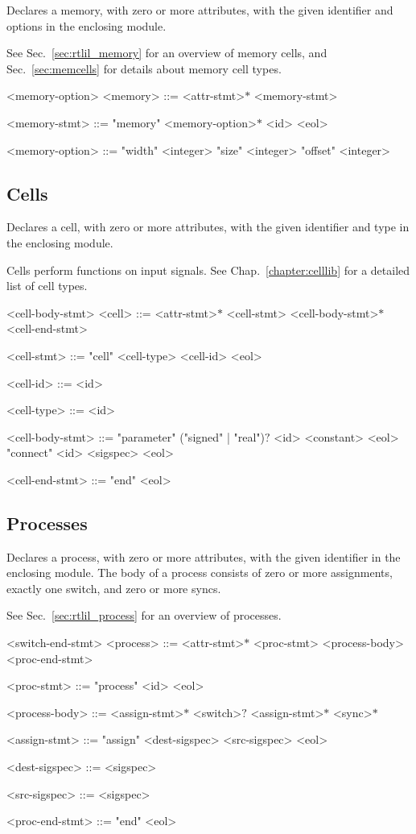 Declares a memory, with zero or more attributes, with the given identifier and options in the enclosing module.

See Sec.~\ref{sec:rtlil_memory} for an overview of memory cells, and Sec.~\ref{sec:memcells} for details about memory cell types.

\begin{indentgrammar}{<memory-option>}
<memory> ::= <attr-stmt>$*$ <memory-stmt>

<memory-stmt> ::= "memory" <memory-option>$*$ <id> <eol>

<memory-option> ::= 
"width" <integer>
  \alt "size" <integer>
  \alt "offset" <integer>
\end{indentgrammar}

\subsection{Cells}

Declares a cell, with zero or more attributes, with the given identifier and type in the enclosing module. 

Cells perform functions on input signals. See Chap.~\ref{chapter:celllib} for a detailed list of cell types.

\begin{indentgrammar}{<cell-body-stmt>}
<cell> ::= <attr-stmt>$*$ <cell-stmt> <cell-body-stmt>$*$ <cell-end-stmt>

<cell-stmt> ::= "cell" <cell-type> <cell-id> <eol>

<cell-id> ::= <id>

<cell-type> ::= <id>

<cell-body-stmt> ::= 
"parameter" ("signed" | "real")$?$ <id> <constant> <eol>
  \alt "connect" <id> <sigspec> <eol>

<cell-end-stmt> ::= "end" <eol>
\end{indentgrammar}

\subsection{Processes}

Declares a process, with zero or more attributes, with the given identifier in the enclosing module. The body of a process consists of zero or more assignments, exactly one switch, and zero or more syncs.

See Sec.~\ref{sec:rtlil_process} for an overview of processes.

\begin{indentgrammar}{<switch-end-stmt>}
<process> ::= <attr-stmt>$*$ <proc-stmt> <process-body> <proc-end-stmt>

<proc-stmt> ::= "process" <id> <eol>

<process-body> ::= <assign-stmt>$*$ <switch>$?$ <assign-stmt>$*$ <sync>$*$

<assign-stmt> ::= "assign" <dest-sigspec> <src-sigspec> <eol>

<dest-sigspec> ::= <sigspec>

<src-sigspec> ::= <sigspec>

<proc-end-stmt> ::= "end" <eol>

\end{indentgrammar}

